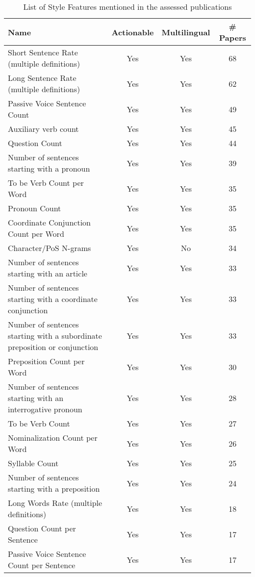\begin{table}[htbp]
    \caption{List of Style Features mentioned in the assessed publications}
    \label{tab:feat_Style}
    \centering
    \begin{tabular}{m{} c c c}
        \toprule
        \textbf{Name} & \textbf{Actionable} & \textbf{Multilingual} & \textbf{\# Papers} \\ 
        \midrule
        Short Sentence Rate (multiple definitions)  & Yes & Yes & 68 \\
        Long Sentence Rate (multiple definitions) & Yes & Yes & 62 \\
        Passive Voice Sentence Count & Yes & Yes & 49 \\
        Auxiliary verb count & Yes & Yes & 45 \\
        Question Count & Yes & Yes & 44 \\
        Number of sentences starting with a pronoun & Yes & Yes & 39 \\
        To be Verb Count per Word & Yes & Yes & 35 \\
        Pronoun Count & Yes & Yes & 35 \\
        Coordinate Conjunction Count per Word & Yes & Yes & 35 \\
        Character/PoS N-grams & Yes & No & 34 \\
        Number of sentences starting with an article & Yes & Yes & 33 \\
        Number of sentences starting with a coordinate conjunction & Yes & Yes & 33 \\
        Number of sentences starting with a subordinate preposition or conjunction & Yes & Yes & 33 \\
        Preposition Count per Word & Yes & Yes & 30 \\
        Number of sentences starting with an interrogative pronoun & Yes & Yes & 28 \\
        To be Verb Count & Yes & Yes & 27 \\
        Nominalization Count per Word & Yes & Yes & 26 \\
        Syllable Count & Yes & Yes & 25 \\
        Number of sentences starting with a preposition & Yes & Yes & 24 \\
        Long Words Rate (multiple definitions) & Yes & Yes & 18 \\
        Question Count per Sentence & Yes & Yes & 17 \\
        Passive Voice Sentence Count per Sentence & Yes & Yes & 17 \\

\end{tabular}
\end{table}
